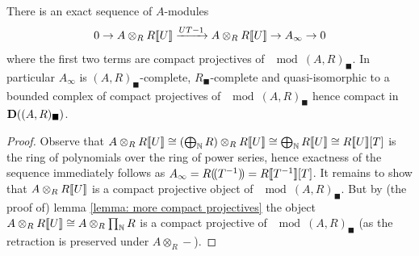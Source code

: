 \begin{lemma}
	\label{lemma: resolution for Ainfty, f.g. case}
	There is an exact sequence of $A$-modules
		$$0\to A \otimes_R {R[\![U]\!]} \xrightarrow{UT - 1} A \otimes_R {R[\![U]\!]} \to A_\infty\to 0$$
	where the first two terms are compact projectives of $\mod{(A, R)_\blacksquare}$. In particular $A_\infty$ is $(A, R)_\blacksquare$-complete, $R_\blacksquare$-complete and quasi-isomorphic to a bounded complex of compact projectives of $\mod{(A, R)_\blacksquare}$ hence compact in ${{\mathbf{D}}((A, R)_\blacksquare)}$.
\end{lemma}
\begin{proof}
	Observe that $A \otimes_R \series R U \cong \mleft(\bigoplus_\N R\mright)\otimes_R \series{R}{U}\cong \bigoplus_\N \series{R}{U}\cong \series R U [T]$ is the ring of polynomials over the ring of power series, hence exactness of the sequence immediately follows as $A_\infty = {R(\!(T^{-1})\!)} = {R[\![T^{-1}]\!]}[T]$. It remains to show that $A\otimes_R {R[\![U]\!]}$ is a compact projective object of $\mod{(A, R)_\blacksquare}$. But by (the proof of) lemma \ref{lemma: more compact projectives} the object $A\otimes_R {R[\![U]\!]} \cong A\otimes_R \prod_{\mathbb{N}} R$ is a compact projective of $\mod{(A, R)_\blacksquare}$ (as the retraction is preserved under $A\otimes_R -$).
	
\end{proof}


